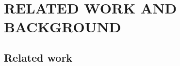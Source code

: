 
\chapter{RELATED WORK AND BACKGROUND}
\label{chap:realred_work}
\section{Related work}





%
%
%
%
%
%
